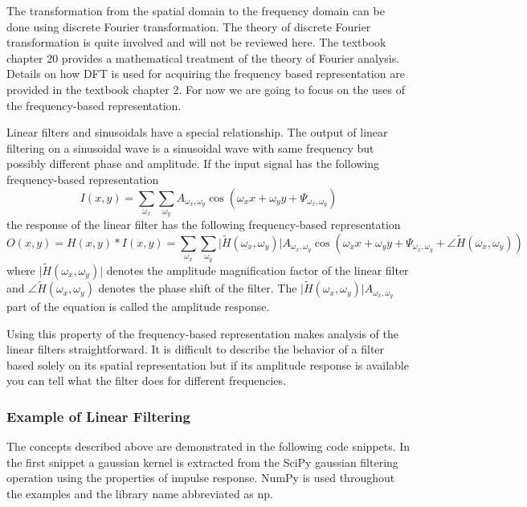 \documentclass[]{article}
\begin{document}
The transformation from the spatial domain to the frequency domain can be done
using discrete Fourier transformation. The theory of discrete Fourier
transformation is quite involved and will not be reviewed here. The textbook
chapter 20 provides a mathematical treatment of the theory of Fourier analysis.
Details on how DFT is used for acquiring the frequency based representation are
provided in the textbook chapter 2.\cite{naturalimagestatistics} For now we are
going to focus on the uses of the frequency-based representation.

Linear filters and sinusoidals have a special relationship. The output of
linear filtering on a sinusoidal wave is a sinusoidal wave with same frequency
but possibly different phase and amplitude. If the input signal has the
following frequency-based representation
\begin{equation}
  I(x,y) = \sum_{\omega_{x}}{\sum_{\omega_{y}}{A_{\omega_{x},\omega_{y}}\cos(\omega_{x}x+\omega_{y}y+\Psi_{\omega_{x},\omega_{y}})}}
\end{equation}
the response of the linear filter has the following frequency-based representation
\begin{equation}
  O(x,y) = H(x,y) \ast I(x,y) = \sum_{\omega_{x}}{\sum_{\omega_{y}}{\lvert \tilde{H}(\omega_{x},\omega_{y})\rvert A_{\omega_{x},\omega_{y}} \cos(\omega_{x} x + \omega_{y} y + \Psi_{\omega_{x},\omega_{y}} + \angle\tilde{H}(\omega_{x},\omega_{y}))}}
\end{equation}
where $\lvert\tilde{H}(\omega_{x},\omega_{y})\rvert$ denotes the amplitude
magnification factor of the linear filter and
$\angle\tilde{H}(\omega_{x},\omega_{y})$ denotes the phase shift of the filter.
The $\lvert\tilde{H}(\omega_{x},\omega_{y})\rvert A_{\omega_{x},\omega_{y}}$
part of the equation is called the amplitude response.

Using this property of the frequency-based representation makes analysis of the
linear filters straightforward. It is difficult to describe the behavior of a
filter based solely on its spatial representation but if its amplitude response
is available you can tell what the filter does for different frequencies.

\subsubsection{Example of Linear Filtering}
\label{example-of-linear-filtering}
The concepts described above are demonstrated in the following code snippets.
In the first snippet a gaussian kernel is extracted from the SciPy gaussian
filtering operation using the properties of impulse response. NumPy is used
throughout the examples and the library name abbreviated as np.
\end{document}
